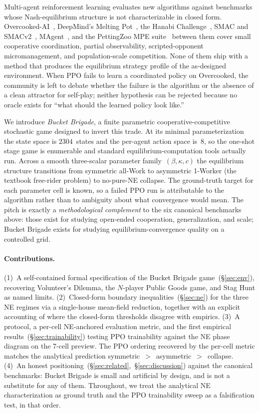 \documentclass{anvil-paper}
\begin{document}
Multi-agent reinforcement learning evaluates new algorithms against benchmarks
whose Nash-equilibrium structure is not characterizable in closed form.
Overcooked-AI~\citep{overcooked2019}, DeepMind's Melting
Pot~\citep{meltingpot2021}, the Hanabi
Challenge~\citep{hanabi2020}, SMAC and SMACv2~\citep{smac2019,smacv2_2023},
MAgent~\citep{magent2018}, and the PettingZoo MPE
suite~\citep{pettingzoo2021} between them cover small cooperative
coordination, partial observability, scripted-opponent micromanagement, and
population-scale competition. None of them ship with a method that produces
the equilibrium strategy profile of the as-designed environment. When PPO
fails to learn a coordinated policy on Overcooked, the community is left to
debate whether the failure is the algorithm or the absence of a clean
attractor for self-play; neither hypothesis can be rejected because no oracle
exists for ``what should the learned policy look like.''

We introduce \emph{Bucket Brigade}, a finite parametric cooperative-competitive
stochastic game designed to invert this trade. At its minimal parameterization
the state space is $2304$~states and the per-agent action space is~$8$, so the
one-shot stage game is enumerable and standard equilibrium-computation tools
actually run. Across a smooth three-scalar parameter family~$(\beta,\kappa,c)$
the equilibrium structure transitions from symmetric all-Work to asymmetric
1-Worker (the textbook free-rider problem) to no-pure-NE collapse. The
ground-truth target for each parameter cell is known, so a failed PPO run is
attributable to the algorithm rather than to ambiguity about what convergence
would mean. The pitch is exactly a \emph{methodological complement} to the
six canonical benchmarks above: those exist for studying open-ended
cooperation, generalization, and scale; Bucket Brigade exists for studying
equilibrium-convergence quality on a controlled grid.

\paragraph{Contributions.} (1)~A self-contained formal specification of the
Bucket Brigade game~(\S\ref{sec:env}), recovering Volunteer's Dilemma, the
$N$-player Public Goods game, and Stag Hunt as named limits.
(2)~Closed-form boundary inequalities~(\S\ref{sec:ne}) for the three NE
regimes via a single-house mean-field reduction, together with an explicit
accounting of where the closed-form thresholds disagree with empirics.
(3)~A protocol, a per-cell NE-anchored evaluation metric, and the first
empirical results~(\S\ref{sec:trainability}) testing PPO trainability against
the NE phase diagram on the 7-cell preview. The PPO ordering recovered by
the per-cell metric matches the analytical prediction
\textsf{symmetric}~$>$~\textsf{asymmetric}~$>$~\textsf{collapse}.
(4)~An honest positioning~(\S\ref{sec:related},~\S\ref{sec:discussion})
against the canonical benchmarks: Bucket Brigade is small and artificial by
design, and is not a substitute for any of them. Throughout, we treat the
analytical NE characterization as ground truth and the PPO trainability
sweep as a falsification test, in that order.
\end{document}
